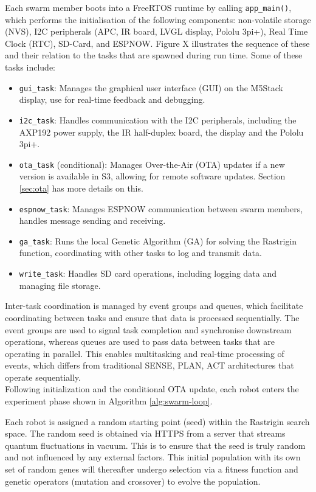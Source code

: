 \documentclass[conference]{IEEEtran}
\begin{document}
Each swarm member boots into a FreeRTOS runtime by calling \texttt{app\_main()}, which performs the initialisation of the following components: non-volatile storage (NVS), I2C peripherals (APC, IR board, LVGL display, Pololu 3pi+), Real Time Clock (RTC), SD-Card, and ESPNOW. Figure X illustrates the sequence of these and their relation to the tasks that are spawned during run time. Some of these tasks include:
\begin{itemize}
  \item \texttt{gui\_task}: Manages the graphical user interface (GUI) on the M5Stack display, use for real-time feedback and debugging.
  \item \texttt{i2c\_task}: Handles communication with the I2C peripherals, including the AXP192 power supply, the IR half-duplex board, the display and the Pololu 3pi+.
  \item \texttt{ota\_task} (conditional): Manages Over-the-Air (OTA) updates if a new version is available in S3, allowing for remote software updates. Section \ref{sec:ota} has more details on this.
  \item \texttt{espnow\_task}: Manages ESPNOW communication between swarm members, handles message sending and receiving.
  \item \texttt{ga\_task}: Runs the local Genetic Algorithm (GA) for solving the Rastrigin function, coordinating with other tasks to log and transmit data.
  \item \texttt{write\_task}: Handles SD card operations, including logging data and managing file storage.
\end{itemize} 

Inter-task coordination is managed by event groups and queues, which facilitate coordinating between tasks and ensure that data is processed sequentially. The event groups are used to signal task completion and synchronise downstream operations, whereas queues are used to pass data between tasks that are operating in parallel. This enables multitasking and real-time processing of events, which differs from traditional SENSE, PLAN, ACT architectures that operate sequentially.\\

Following initialization and the conditional OTA update, each robot enters the experiment phase shown in Algorithm \ref{alg:swarm-loop}. 

Each robot is assigned a random starting point (seed) within the Rastrigin search space. The random seed is obtained via HTTPS from a server that streams quantum fluctuations in vacuum. This is to ensure that the seed is truly random and not influenced by any external factors. This initial population with its own set of random genes will thereafter undergo selection via a fitness function and genetic operators (mutation and crossover) to evolve the population.
\end{document}
